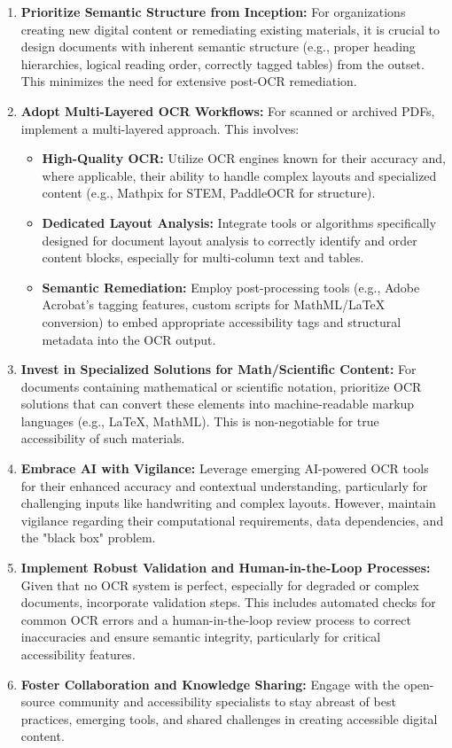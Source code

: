 \begin{enumerate}
    \item \textbf{Prioritize Semantic Structure from Inception:} For organizations creating new digital content or remediating existing materials, it is crucial to design documents with inherent semantic structure (e.g., proper heading hierarchies, logical reading order, correctly tagged tables) from the outset. This minimizes the need for extensive post-OCR remediation.
    \item \textbf{Adopt Multi-Layered OCR Workflows:} For scanned or archived PDFs, implement a multi-layered approach. This involves:
    \begin{itemize}
        \item \textbf{High-Quality OCR:} Utilize OCR engines known for their accuracy and, where applicable, their ability to handle complex layouts and specialized content (e.g., Mathpix for STEM, PaddleOCR for structure).
        \item \textbf{Dedicated Layout Analysis:} Integrate tools or algorithms specifically designed for document layout analysis to correctly identify and order content blocks, especially for multi-column text and tables.
        \item \textbf{Semantic Remediation:} Employ post-processing tools (e.g., Adobe Acrobat's tagging features, custom scripts for MathML/LaTeX conversion) to embed appropriate accessibility tags and structural metadata into the OCR output.
    \end{itemize}
    \item \textbf{Invest in Specialized Solutions for Math/Scientific Content:} For documents containing mathematical or scientific notation, prioritize OCR solutions that can convert these elements into machine-readable markup languages (e.g., LaTeX, MathML). This is non-negotiable for true accessibility of such materials.
    \item \textbf{Embrace AI with Vigilance:} Leverage emerging AI-powered OCR tools for their enhanced accuracy and contextual understanding, particularly for challenging inputs like handwriting and complex layouts. However, maintain vigilance regarding their computational requirements, data dependencies, and the "black box" problem.
    \item \textbf{Implement Robust Validation and Human-in-the-Loop Processes:} Given that no OCR system is perfect, especially for degraded or complex documents, incorporate validation steps. This includes automated checks for common OCR errors and a human-in-the-loop review process to correct inaccuracies and ensure semantic integrity, particularly for critical accessibility features.
    \item \textbf{Foster Collaboration and Knowledge Sharing:} Engage with the open-source community and accessibility specialists to stay abreast of best practices, emerging tools, and shared challenges in creating accessible digital content.
\end{enumerate}

